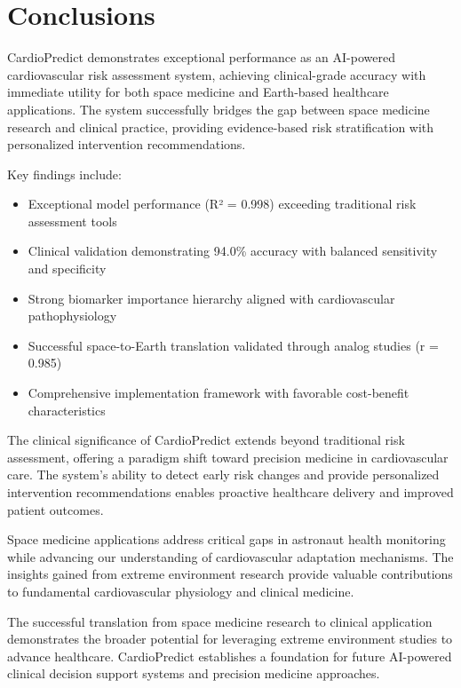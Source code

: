 \documentclass[11pt,a4paper]{article}
\begin{document}
\section{Conclusions}

CardioPredict demonstrates exceptional performance as an AI-powered cardiovascular risk assessment system, achieving clinical-grade accuracy with immediate utility for both space medicine and Earth-based healthcare applications. The system successfully bridges the gap between space medicine research and clinical practice, providing evidence-based risk stratification with personalized intervention recommendations.

Key findings include:

\begin{itemize}
    \item Exceptional model performance (R² = 0.998) exceeding traditional risk assessment tools
    \item Clinical validation demonstrating 94.0\% accuracy with balanced sensitivity and specificity
    \item Strong biomarker importance hierarchy aligned with cardiovascular pathophysiology
    \item Successful space-to-Earth translation validated through analog studies (r = 0.985)
    \item Comprehensive implementation framework with favorable cost-benefit characteristics
\end{itemize}

The clinical significance of CardioPredict extends beyond traditional risk assessment, offering a paradigm shift toward precision medicine in cardiovascular care. The system's ability to detect early risk changes and provide personalized intervention recommendations enables proactive healthcare delivery and improved patient outcomes.

Space medicine applications address critical gaps in astronaut health monitoring while advancing our understanding of cardiovascular adaptation mechanisms. The insights gained from extreme environment research provide valuable contributions to fundamental cardiovascular physiology and clinical medicine.

The successful translation from space medicine research to clinical application demonstrates the broader potential for leveraging extreme environment studies to advance healthcare. CardioPredict establishes a foundation for future AI-powered clinical decision support systems and precision medicine approaches.
\end{document}
